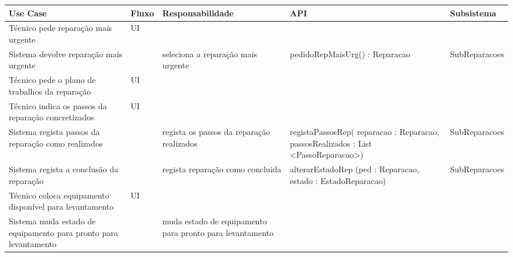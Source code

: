 \documentclass[../relatorio.tex]{subfiles}
\begin{document}
\begin{landscape}
    \begin{table}[!h]
        \centering
        \begin{tabular}{|p{5cm}|p{1cm}|p{4cm}|p{6cm}|p{3cm}|}
            \hline
            \rowcolor{gray!20!white}
            Use Case & Fluxo                                            & Responsabilidade & API & Subsistema \\
            \hline
            \rowcolor{yellow}
            Técnico pede reparação mais urgente
                     & UI
                     & 
                     & 
                     & 
            \\
            \hline
            Sistema devolve reparação mais urgente
                     & 
                     & seleciona a reparação mais urgente
                     & pedidoRepMaisUrg() : Reparacao
                     & SubReparacoes
            \\
            \hline
            \rowcolor{yellow}
            Técnico pede o plano de trabalhos da reparação
                     & UI
                     & 
                     & 
                     & 
            \\
            \hline
            \rowcolor{yellow}
            Técnico indica os passos da reparação concretizados
                     & UI
                     & 
                     & 
                     & 
            \\
            \hline
            Sistema regista passos da reparação como realizados
                     & 
                     & regista os passos da reparação realizados 
                     & registaPassosRep( reparacao : Reparacao, passosRealizados : List <PassoReparacao>)
                     & SubReparacoes
            \\
            \hline
            Sistema regista a conclusão da reparação
                     & 
                     & regista reparação como concluida
                     & alterarEstadoRep (ped : Reparacao, estado : EstadoReparacao)
                     & SubReparacoes
            \\
            \hline
            Técnico coloca equipamento disponível para levantamento
                     & UI
                     & 
                     & 
                     & 
            \\
            \hline
            Sistema muda estado de equipamento para pronto para levantamento
                     & 
                     & muda estado de equipamento para pronto para levantamento

\end{tabular}
\end{table}
\end{landscape}
\end{document}
